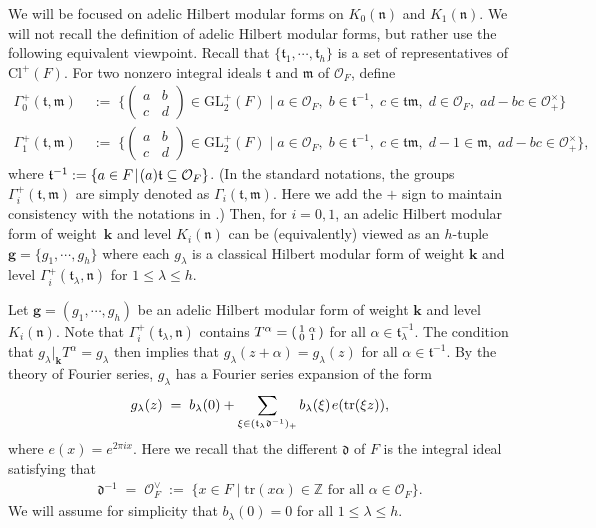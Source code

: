 \documentclass[11pt]{amsart}
\theoremstyle{remark}
\newcommand\m[1]{\begin{pmatrix}#1\end{pmatrix}}
\newcommand\sm[1]{\begin{psmallmatrix}#1\end{psmallmatrix}}
\newcommand\mbf[1]{\mathbf{#1}}
\newcommand\fr[1]{\mathfrak{#1}}
\newcommand{\inte}{\mathbb{Z}}
\newcommand{\clo}{\mathcal{O}}
\newcommand{\eq}{\;=\;}
\newcommand{\deq}{\;:=\;}
\def\thin{{\hskip 1pt}}
\newcommand{\GL}{\mathrm{GL}}
\newcommand{\tr}{\mathrm{tr}}
\newcommand{\Cl}{\mathrm{Cl}}
\begin{document}
We will be focused on adelic Hilbert modular forms on $K_0(\fr{n})$ and $K_1(\fr{n})$. We will not recall the definition of adelic Hilbert modular forms, but rather use the following equivalent viewpoint. Recall that $\{\fr{t}_1,\cdots,\fr{t}_h\}$ is a set of representatives of $\Cl^+(F)$. For two nonzero integral ideals $\fr{t}$ and $\fr{m}$ of $\clo_F$, define
\begin{align*}
    \Gamma_0^+(\fr{t},\fr{m})&\deq\bigg\{\m{a&b\\c&d}\in\GL_2^+(F)\;\bigg|\;a\in\clo_F,\;b\in\fr{t}^{-1},\;c\in\fr{t}\fr{m},\;d\in\clo_F,\;ad-bc\in\clo_+^\times\bigg\} \\
    \Gamma_1^+(\fr{t},\fr{m})&\deq\bigg\{\m{a&b\\c&d}\in\GL_2^+(F)\;\bigg|\;a\in\clo_F,\;b\in\fr{t}^{-1},\;c\in\fr{t}\fr{m},\;d-1\in\fr{m},\;ad-bc\in\clo_+^\times\bigg\},
\end{align*}
where $\fr{t}^{-1}:=\{a\in F\thin|\thin(a)\fr{t}\subseteq\clo_F\}$. (In the standard notations, the groups $\Gamma_i^+(\fr{t},\fr{m})$ are simply denoted as $\Gamma_i(\fr{t},\fr{m})$. Here we add the $+$ sign to maintain consistency with the notations in .) Then, for $i=0,1$, an adelic Hilbert modular form of weight~$\mbf{k}$ and level $K_i(\fr{n})$ can be (equivalently) viewed as an $h$-tuple $\mbf{g}=\{g_1,\cdots,g_h\}$ where each $g_\lambda$ is a classical Hilbert modular form of weight $\mbf{k}$ and level $\Gamma_i^+(\fr{t}_\lambda,\fr{n})$ for $1\leq\lambda\leq h$.

Let \mbox{$\mbf{g}=(g_1,\cdots,g_h)$} be an adelic Hilbert modular form of weight $\mbf{k}$ and level $K_i(\fr{n})$. Note that $\Gamma_i^+(\fr{t}_\lambda,\fr{n})$ contains $T^\alpha=\sm{1&\alpha\\0&1}$ for all $\alpha\in\fr{t}_\lambda^{-1}$. The condition that $g_\lambda|_\mbf{k}T^\alpha=g_\lambda$ then implies that $g_\lambda(z+\alpha)=g_\lambda(z)$ for all $\alpha\in\fr{t}^{-1}$. By the theory of Fourier series, $g_\lambda$ has a Fourier series expansion of the form
\begin{align*}
    g_\lambda(z)\eq b_\lambda(0)+\sum_{\xi\in(\fr{t}_\lambda\fr{d}^{-1})_+}b_\lambda(\xi)\thin e(\tr(\xi z)),
\end{align*}
where $e(x)=e^{2\pi ix}$. Here we recall that the different $\fr{d}$ of $F$ is the integral ideal satisfying that
\begin{align*}
    \fr{d}^{-1}\eq\clo_F^\vee\deq\{x\in F\mid\tr(x\alpha)\in\inte\text{ for all }\alpha\in\clo_F\}.
\end{align*}
We will assume for simplicity that $b_\lambda(0)=0$ for all $1\leq\lambda\leq h$.
\end{document}
